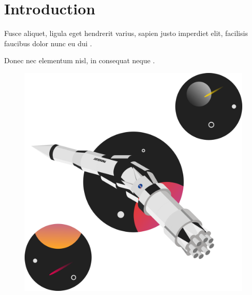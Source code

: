 \section{Introduction}

\lipsum[4][2-18]

\lipsum[2]
Fusce aliquet, ligula eget hendrerit varius, sapien justo imperdiet elit, facilisis
faucibus dolor nunc eu dui .

\lipsum[3]
Donec nec elementum nisl, in consequat neque \cite[p.100]{stephenson1998}.

\begin{figure}[ht]
    \centering
    \includegraphics[scale=0.2]{images/catastrophic-failure.png}
    \caption{\lipsum[1][1]}\label{fig:test}
\end{figure}
